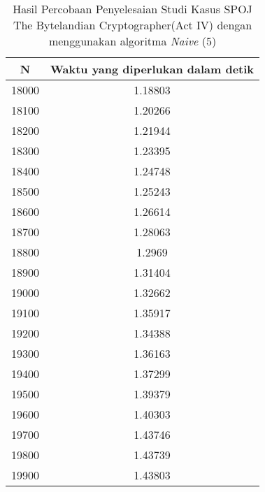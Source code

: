 \begin{table}[H]
\centering
\begin{tabular}{|c|c|}\hline
N&Waktu yang diperlukan dalam detik\\ \hline
18000&1.18803\\ \hline
18100&1.20266\\ \hline
18200&1.21944\\ \hline
18300&1.23395\\ \hline
18400&1.24748\\ \hline
18500&1.25243\\ \hline
18600&1.26614\\ \hline
18700&1.28063\\ \hline
18800&1.2969\\ \hline
18900&1.31404\\ \hline
19000&1.32662\\ \hline
19100&1.35917\\ \hline
19200&1.34388\\ \hline
19300&1.36163\\ \hline
19400&1.37299\\ \hline
19500&1.39379\\ \hline
19600&1.40303\\ \hline
19700&1.43746\\ \hline
19800&1.43739\\ \hline
19900&1.43803\\ \hline
\end{tabular}
\caption {Hasil Percobaan Penyelesaian Studi Kasus SPOJ The Bytelandian Cryptographer(Act IV) dengan menggunakan algoritma \textit{Naive} (5)}
\label{tab:1res10}
\end{table}